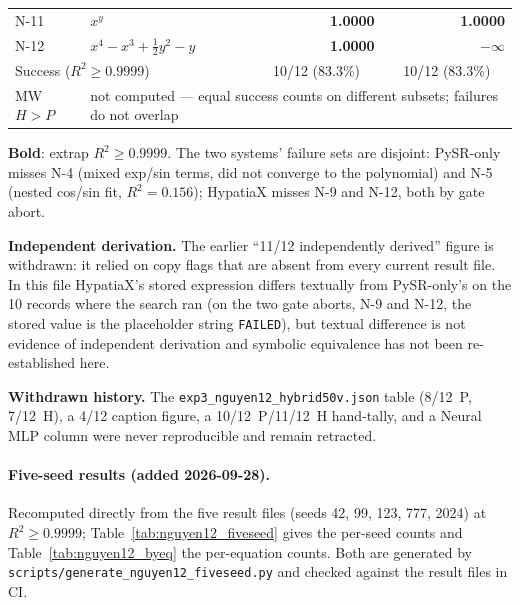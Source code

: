 \documentclass[twoside,11pt]{article}
\newcommand{\Rsq}{R^{2}}
\begin{document}
\begin{table}[h]
\begin{threeparttable}
\begin{tabular}{llrr}
N-11 & $x^y$                                         & \textbf{1.0000} & \textbf{1.0000} \\
N-12 & $x^4 - x^3 + \tfrac{1}{2}y^2 - y$              & \textbf{1.0000} & $-\infty$ \\
\midrule
\multicolumn{2}{l}{Success ($\Rsq\ge0.9999$)}
  & \multicolumn{1}{c}{10/12 (83.3\%)}
  & \multicolumn{1}{c}{10/12 (83.3\%)} \\
MW $H>P$   & \multicolumn{3}{l}{not computed --- equal success counts on different subsets; failures do not overlap} \\
\bottomrule
\end{tabular}
\begin{tablenotes}\small
  \item \textbf{Bold}: extrap $\Rsq \ge 0.9999$. The two systems' failure sets are
    disjoint: PySR-only misses N-4 (mixed exp/sin terms, did not converge to the
    polynomial) and N-5 (nested cos/sin fit, $\Rsq=0.156$); HypatiaX misses N-9
    and N-12, both by gate abort.
  \item[$\ddag$] \textbf{Independent derivation.} The earlier ``11/12 independently derived''
    figure is withdrawn: it relied on copy flags that are absent from every current
    result file. In this file HypatiaX's stored expression differs textually from
    PySR-only's on the 10 records where the search ran (on the two gate aborts, N-9 and
    N-12, the stored value is the placeholder string \texttt{FAILED}), but textual difference is not evidence of
    independent derivation and symbolic equivalence has not been re-established here.
  \item[$\S$] \textbf{Withdrawn history.} The
    \texttt{exp3\_nguyen12\_hybrid50v.json} table (8/12~P, 7/12~H), a
    4/12 caption figure, a 10/12~P/11/12~H hand-tally, and a Neural MLP column were
    never reproducible and remain retracted.
\end{tablenotes}
\end{threeparttable}
\end{table}

\paragraph{Five-seed results (added 2026-09-28).} Recomputed directly from the
five result files (seeds 42, 99, 123, 777, 2024) at $\Rsq\ge0.9999$;
Table~\ref{tab:nguyen12_fiveseed} gives the per-seed counts and
Table~\ref{tab:nguyen12_byeq} the per-equation counts. Both are generated by
\texttt{scripts/generate\_nguyen12\_fiveseed.py} and checked against the result files in CI.
\end{document}
